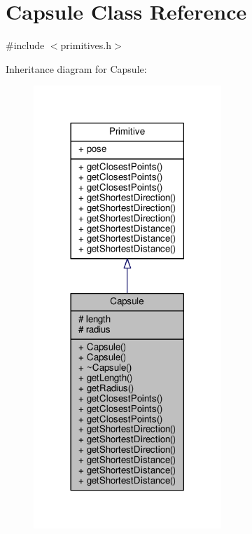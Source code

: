 \hypertarget{class_capsule}{}\section{Capsule Class Reference}
\label{class_capsule}


{\ttfamily \#include $<$primitives.\+h$>$}



Inheritance diagram for Capsule\+:
\nopagebreak
\begin{figure}[H]
\begin{center}
\leavevmode
\includegraphics[width=201pt]{class_capsule__inherit__graph}
\end{center}
\end{figure}


